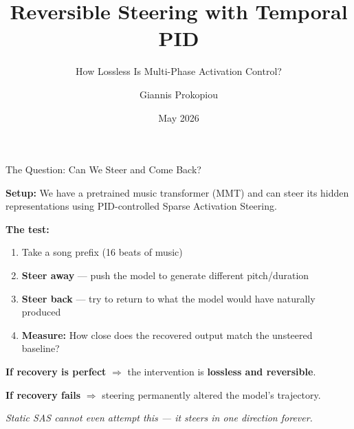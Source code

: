 \documentclass[aspectratio=169]{beamer}
\title{Reversible Steering with Temporal PID}
\subtitle{How Lossless Is Multi-Phase Activation Control?}
\author{Giannis Prokopiou}
\date{May 2026}
\begin{document}
\begin{frame}
\titlepage
\end{frame}

\begin{frame}{The Question: Can We Steer and Come Back?}

\textbf{Setup:} We have a pretrained music transformer (MMT) and can steer its hidden representations using PID-controlled Sparse Activation Steering.

\vspace{0.5em}

\textbf{The test:}
\begin{enumerate}
    \item Take a song prefix (16 beats of music)
    \item \textbf{Steer away} — push the model to generate different pitch/duration
    \item \textbf{Steer back} — try to return to what the model would have naturally produced
    \item \textbf{Measure:} How close does the recovered output match the unsteered baseline?
\end{enumerate}

\vspace{1em}

\textbf{If recovery is perfect} $\Rightarrow$ the intervention is \textbf{lossless and reversible}.

\textbf{If recovery fails} $\Rightarrow$ steering permanently altered the model's trajectory.

\vspace{0.5em}
\textit{Static SAS cannot even attempt this — it steers in one direction forever.}

\end{frame}
\end{document}
